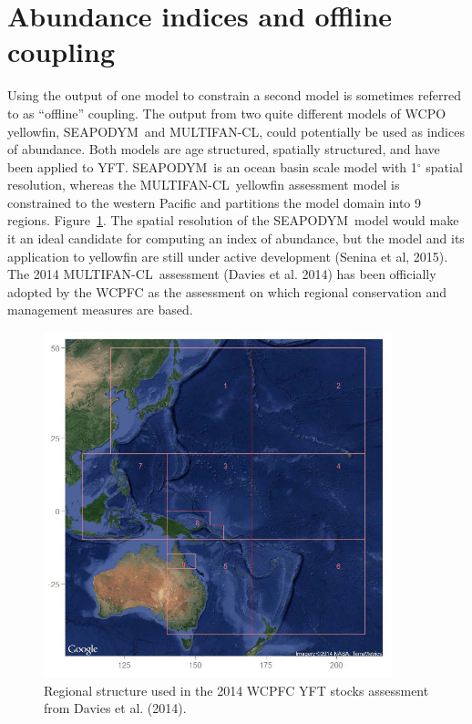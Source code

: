 \documentclass[12pt,letterpaper]{article}
\renewcommand\deg[1]{$^\circ$#1}
\newcommand\SD{SEAPODYM}
\newcommand\MFCL{MULTIFAN-CL}
\begin{document}
\clearpage
\section{Abundance indices and offline coupling}
\label{sec:index}
Using the output of one model to constrain a second model is sometimes
referred to as ``offline'' coupling. 
The output from two quite different models of WCPO yellowfin,
\SD\ and \MFCL, could potentially be used as indices of abundance.
Both models are age structured, spatially structured, and have been
applied to YFT.
\SD\ is an ocean basin scale model with 1\deg{} spatial resolution,
whereas the \MFCL\ yellowfin assessment model is constrained to the
western Pacific and partitions the model domain into 9 regions.
Figure~\ref{fig:mfclregions}.
The spatial resolution of the \SD\ model would make it an ideal
candidate for computing an index of abundance, but the model and its
application to yellowfin are still under active development (Senina et
al, 2015). 
The 2014 \MFCL\ assessment (Davies et al. 2014) has been officially
adopted by the WCPFC as the assessment on which regional conservation
and management measures are based.

\begin{figure}
\begin{center}
\includegraphics[width=0.9\textwidth]{./graphics/MFCLregions.png}
\caption{\label{fig:mfclregions}
Regional structure used in the 2014 WCPFC YFT stocks assessment from
Davies et al. (2014).
}
\end{center}
\end{figure}
\end{document}

